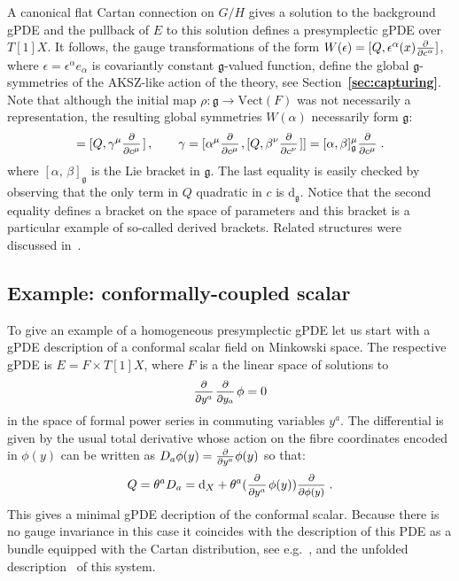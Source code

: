 \documentclass[a4paper,12pt]{article}
\numberwithin{equation}{section} %
\newcommand{\bref}[1]{\textbf{\ref{#1}}}
\newcommand{\dx}{\mathrm{d}_X}
\renewcommand{\d}{\partial}
\newcommand{\commut}[2]{[#1{,}\,#2]}
\newcommand{\ffrac}[2]{\raisebox{.5pt}%
  {\footnotesize$\displaystyle\frac{#1}{#2}$}\kern1pt}
\newcommand{\dl}[1]{\mathchoice{\ffrac{\d}{\d #1}}{\frac{\d}{\d #1}}{\ffrac{\d}{\d #1}}{\ffrac{\d}{\d #1}}}
\newcommand{\ddl}[2]{\ffrac{\d #1}{\d #2}}
\newcommand{\Liealg}{\mathfrak}
\newcommand{\algg}{\Liealg{g}}
\newcommand{\dg}{\mathrm{d}_\algg}
\begin{document}
A canonical flat Cartan connection on $G/H$ gives a solution to the background gPDE and the pullback of $E$ to this solution defines a presymplectic gPDE over $T[1]X$. It follows, the gauge transformations of the form $W(\epsilon)=\commut{Q}{\epsilon^\alpha(x)\dl{c^\alpha}}$, where $\epsilon=\epsilon^\alpha e_\alpha$
is covariantly constant $\algg$-valued function, define the global $\algg$-symmetries of the AKSZ-like action of the theory, see Section~\bref{sec:capturing}. Note that although the initial map $\rho:\algg \to \mathrm{Vect}(F)$
was not necessarily a representation, the resulting global symmetries $W(\alpha)$ necessarily form $\algg$:
\begin{equation}
\commut{W(\alpha)}{W(\beta)}=\commut{Q}{\gamma^\mu\dl{c^\mu}}\,, \qquad 
\gamma=\commut{\alpha^\mu\dl{c^\mu}}{\commut{Q}{\beta^\nu\dl{c^\nu}}}=\commut{\alpha}{\beta}_\algg^\mu\dl{c^\mu}\,.
\end{equation}
where $\commut{\alpha}{\beta}_\algg$ is the Lie bracket in $\algg$. The last equality is easily checked by observing that the only term in $Q$ quadratic in $c$ is $\dg$. Notice that the second equality defines  a bracket on the space of parameters and this bracket is a particular example of so-called derived brackets. Related structures were discussed in~\cite{Grigoriev:1998gn,Grigoriev:2000zg,Barnich:2001jy}.











\subsection{Example: conformally-coupled scalar} \label{sec:conf-scal}

To give an example of a homogeneous presymplectic gPDE let us start with a  gPDE description of a conformal scalar
field on Minkowski space. The respective gPDE is $E=F\times T[1]X$, where $F$ is a the linear space of solutions to 
\begin{equation}
    \ddl{}{y^a}\ddl{}{y_a}\phi = 0
\end{equation}
in the space of formal power series in commuting variables $y^a$. The differential is given by the usual total derivative whose action on the fibre coordinates encoded in $\phi(y)$ can be written as $D_a \phi(y)=\dl{y^a}\phi(y)$ so that:
\begin{equation}
\label{cscalar}
Q=\theta^a D_a=\dx+ \theta^a(\dl{y^a}\phi(y))\dl{\phi(y)}\,.
\end{equation}
This gives a minimal gPDE decription of the conformal scalar. Because there is no gauge invariance in this case it coincides with the description of this PDE as a bundle equipped with the Cartan distribution, see e.g.~\cite{vinogradov:2001,Krasil'shchik:2010ij}, and the unfolded description~\cite{Vasiliev:1980as,Lopatin:1987hz} of this system.
\end{document}
